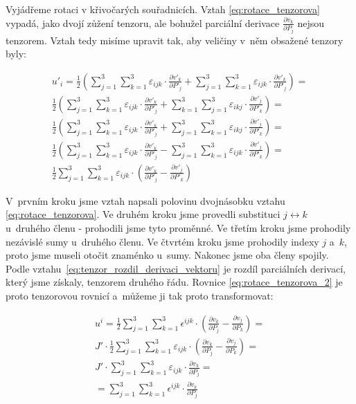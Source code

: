 Vyjádřeme rotaci v křivočarých souřadnicích. Vztah \eqref{eq:rotace_tenzorova} vypadá, jako dvojí zůžení tenzoru, ale bohužel parciální derivace \(\frac{\partial v_k}{\partial P_j}\) nejsou tenzorem. Vztah tedy misíme upravit tak, aby veličiny v~něm obsažené tenzory byly:

\begin{equation}
\label{eq:rotace_tenzorova_2}
\begin{split}
u'_i = \frac{1}{2} \left(\sum_{j=1}^3 \sum_{k=1}^3 \varepsilon_{ijk} \cdot \frac{\partial v'_k}{\partial P'_j} + \sum_{j=1}^3 \sum_{k=1}^3 \varepsilon_{ijk} \cdot \frac{\partial v'_k}{\partial P'_j} \right) = \\
\frac{1}{2} \left(\sum_{j=1}^3 \sum_{k=1}^3 \varepsilon_{ijk} \cdot \frac{\partial v'_k}{\partial P'_j} + \sum_{k=1}^3 \sum_{j=1}^3 \varepsilon_{ikj} \cdot \frac{\partial v'_j}{\partial P'_k} \right) = \\
\frac{1}{2} \left(\sum_{j=1}^3 \sum_{k=1}^3 \varepsilon_{ijk} \cdot \frac{\partial v'_k}{\partial P'_j} + \sum_{j=1}^3 \sum_{k=1}^3 \varepsilon_{ikj} \cdot \frac{\partial v'_j}{\partial P'_k} \right) = \\
\frac{1}{2} \left(\sum_{j=1}^3 \sum_{k=1}^3 \varepsilon_{ijk} \cdot \frac{\partial v'_k}{\partial P'_j} - \sum_{j=1}^3 \sum_{k=1}^3 \varepsilon_{ijk} \cdot \frac{\partial v'_j}{\partial P'_k} \right) = \\
\frac{1}{2} \sum_{j=1}^3 \sum_{k=1}^3 \varepsilon_{ijk} \cdot \left(\frac{\partial v'_k}{\partial P'_j} - \frac{\partial v'_j}{\partial P'_k} \right)
\end{split}
\end{equation}

V~prvním kroku jsme vztah napsali polovinu dvojnásobku vztahu \eqref{eq:rotace_tenzorova}. Ve druhém kroku jsme provedli substituci \(j \leftrightarrow k\) u~druhého členu - prohodili jsme tyto proměnné. Ve třetím kroku jsme prohodily nezávislé sumy u~druhého členu. Ve čtvrtém kroku jsme prohodily indexy \(j\) a~\(k\), proto jsme museli otočit znaménko u~sumy. Nakonec jsme oba členy spojily. Podle vztahu~\eqref{eq:tenzor_rozdil_derivaci_vektoru} je rozdíl parciálních derivací, který jsme získaly, tenzorem druhého řádu. Rovnice \eqref{eq:rotace_tenzorova_2} je proto tenzorovou rovnicí a~můžeme ji tak proto transformovat:

\begin{equation}
\label{eq:rotace_tenzorova_3}
\begin{split}
u^i = \frac{1}{2} \sum_{j=1}^3 \sum_{k=1}^3 \epsilon^{ijk} \cdot \left(\frac{\partial v_k}{\partial P_j} - \frac{\partial v_j}{\partial P_k} \right) = \\
J' \cdot \frac{1}{2} \sum_{j=1}^3 \sum_{k=1}^3 \varepsilon_{ijk} \cdot \left(\frac{\partial v_k}{\partial P_j} - \frac{\partial v_j}{\partial P_k} \right) = \\
J' \cdot \sum_{j=1}^3 \sum_{k=1}^3 \varepsilon_{ijk} \cdot \frac{\partial v_k}{\partial P_j} = \\
= \sum_{j=1}^3 \sum_{k=1}^3 \epsilon^{ijk} \cdot \frac{\partial v_k}{\partial P_j}
\end{split}
\end{equation}

